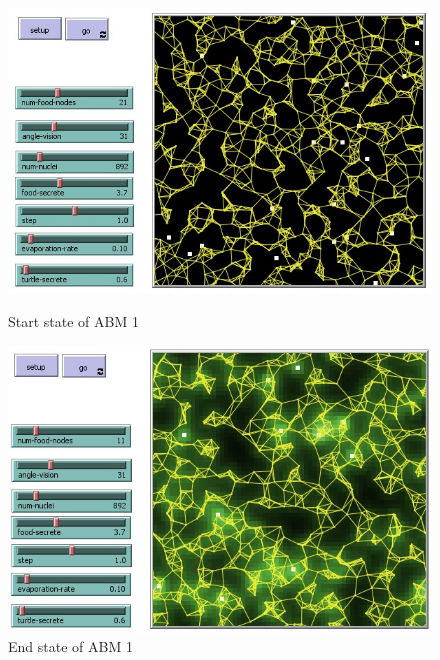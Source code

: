 \documentclass[a4paper, 12pt]{article}
\begin{document}
    \begin{figure}[h!]
        \centering
        \includegraphics[scale = 0.67]{Images/abm2_start.jpg}
        \caption{Start state of ABM 1}
        \label{fig:abm2start}
        \includegraphics[scale = 0.67]{Images/abm2_end.jpg}
        \caption{End state of ABM 1}
        \label{fig:abm2end}
    \end{figure}
    \newpage
\end{document}
